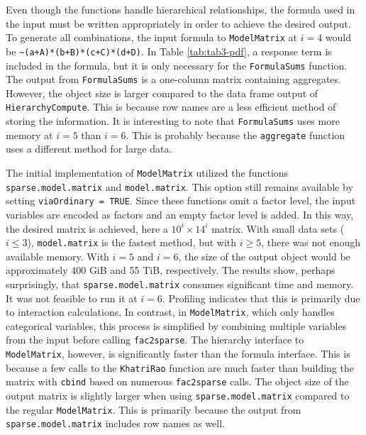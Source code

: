 Even though the functions handle hierarchical relationships, the formula used in the input must be written appropriately in order to achieve the desired output.
To generate all combinations, the input formula to \texttt{ModelMatrix} at \(i=4\) would be \texttt{\textasciitilde{}(a+A)*(b+B)*(c+C)*(d+D)}.
In Table \ref{tab:tab3-pdf},
a response term is included in the formula, but it is only necessary for the \texttt{FormulaSums} function.
The output from \texttt{FormulaSums} is a one-column matrix containing aggregates.
However, the object size is larger compared to the data frame output of \texttt{HierarchyCompute}.
This is because row names are a less efficient method of storing the information.
It is interesting to note that \texttt{FormulaSums} uses more memory at \(i=5\) than \(i=6\).
This is probably because the \texttt{aggregate} function uses a different method for large data.

The initial implementation of \texttt{ModelMatrix} utilized the functions \texttt{sparse.model.matrix} and \linebreak  \texttt{model.matrix}.
This option still remains available by setting \texttt{viaOrdinary\ =\ TRUE}.
Since these functions omit a factor level, the input variables are encoded as factors and an empty factor level is added.
In this way, the desired matrix is achieved, here a \(10^i \times 14^i\) matrix.
With small data sets (\(i \leq 3\)), \texttt{model.matrix} is the fastest method, but with \(i \geq 5\), there was not enough available memory.
With \(i=5\) and \(i=6\), the size of the output object would be approximately 400 GiB and 55 TiB, respectively.
The results show, perhaps surprisingly, that \texttt{sparse.model.matrix} consumes significant time and memory.
It was not feasible to run it at \(i=6\).
Profiling indicates that this is primarily due to interaction calculations.
In contrast, in \texttt{ModelMatrix}, which only handles categorical variables, this process is simplified by combining multiple variables from the input before calling \texttt{fac2sparse}.
The hierarchy interface to \texttt{ModelMatrix}, however, is significantly faster than the formula interface.
This is because a few calls to the \texttt{KhatriRao} function are much faster than building the matrix with \texttt{cbind} based on numerous \texttt{fac2sparse} calls.
The object size of the output matrix is slightly larger when using \texttt{sparse.model.matrix} compared to the regular \texttt{ModelMatrix}.
This is primarily because the output from \texttt{sparse.model.matrix} includes row names as well.

